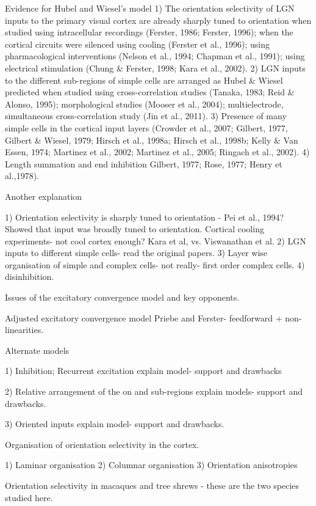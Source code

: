 Evidence for Hubel and Wiesel's model
1) The orientation selectivity of LGN inputs to the primary visual cortex are already sharply tuned to orientation when studied using intracellular recordings (Ferster, 1986; Ferster, 1996); when the cortical circuits were silenced using cooling (Ferster et al., 1996); using pharmacological interventions (Nelson et al., 1994; Chapman et al., 1991); using electrical stimulation (Chung \& Ferster, 1998; Kara et al., 2002).
2) LGN inputs to the different sub-regions of simple cells are arranged as Hubel \& Wiesel predicted when studied using cross-correlation studies (Tanaka, 1983; Reid \& Alonso, 1995); morphological studies (Mooser et al., 2004); multielectrode, simultaneous cross-correlation study (Jin et al., 2011).
3) Presence of many simple cells in the cortical input layers (Crowder et al., 2007; Gilbert, 1977, Gilbert \& Wiesel, 1979; Hirsch et al., 1998a; Hirsch et al., 1998b; Kelly \& Van Essen, 1974; Martinez et al., 2002; Martinez et al., 2005; Ringach et al., 2002).
4) Length summation and end inhibition Gilbert, 1977; Rose, 1977; Henry et al.,1978).

Another explanation

1) Orientation selectivity is sharply tuned to orientation - Pei et al., 1994? Showed that input was broadly tuned to orientation. Cortical cooling experiments- not cool cortex enough? Kara et al, vs. Viswanathan et al.
2) LGN inputs to different simple cells- read the original papers.
3) Layer wise organisation of simple and complex cells- not really- first order complex cells.
4) disinhibition.

Issues of the excitatory convergence model and key opponents.

Adjusted excitatory convergence model
Priebe and Ferster- feedforward + non-linearities.

Alternate models

1) Inhibition; Recurrent excitation
explain model- support and drawbacks

2) Relative arrangement of the on and sub-regions
explain models- support and drawbacks.

3) Oriented inputs
explain model- support and drawbacks.


Organisation of orientation selectivity in the cortex.

1) Laminar organisation
2) Columnar organisation
3) Orientation anisotropies

Orientation selectivity in macaques and tree shrews - these are the two species studied here.


